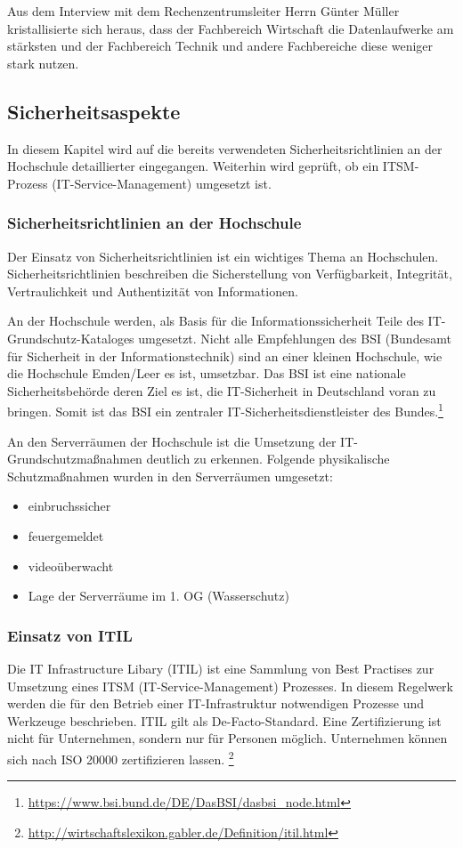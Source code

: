 Aus dem Interview mit dem Rechenzentrumsleiter Herrn Günter Müller kristallisierte sich heraus, dass der Fachbereich Wirtschaft die Datenlaufwerke am stärksten und der Fachbereich Technik und andere Fachbereiche diese weniger stark nutzen.

\subsection{Sicherheitsaspekte}
In diesem Kapitel wird auf die bereits verwendeten Sicherheitsrichtlinien an der Hochschule detaillierter eingegangen. Weiterhin wird geprüft, ob ein ITSM-Prozess (IT-Service-Management)  umgesetzt ist.

\subsubsection{Sicherheitsrichtlinien an der Hochschule}
Der Einsatz von Sicherheitsrichtlinien ist ein wichtiges Thema an Hochschulen. Sicherheitsrichtlinien beschreiben die Sicherstellung von Verfügbarkeit, Integrität, Vertraulichkeit und Authentizität von Informationen.

An der Hochschule werden, als Basis für die Informationssicherheit Teile des IT-Grundschutz-Kataloges umgesetzt. Nicht alle Empfehlungen des BSI (Bundesamt für Sicherheit in der Informationstechnik) sind an einer kleinen Hochschule, wie die Hochschule Emden/Leer es ist,  umsetzbar. Das BSI ist eine nationale Sicherheitsbehörde deren Ziel es ist, die IT-Sicherheit in Deutschland voran zu bringen. Somit ist das BSI ein zentraler IT-Sicherheitsdienstleister des Bundes.\footnote{\url{https://www.bsi.bund.de/DE/DasBSI/dasbsi_node.html}}

An den Serverräumen der Hochschule ist die Umsetzung der IT-Grundschutzmaßnahmen deutlich zu erkennen.
Folgende physikalische Schutzmaßnahmen wurden in den Serverräumen umgesetzt:

\begin{itemize}
	\item einbruchssicher
	\item feuergemeldet
	\item videoüberwacht
	\item Lage der Serverräume im 1. OG (Wasserschutz)
\end{itemize}

\subsubsection{Einsatz von ITIL}
Die IT Infrastructure Libary (ITIL) ist eine Sammlung von Best Practises zur Umsetzung eines ITSM (IT-Service-Management) Prozesses. In diesem Regelwerk werden die für den Betrieb einer IT-Infrastruktur notwendigen Prozesse und Werkzeuge beschrieben. ITIL gilt als De-Facto-Standard. Eine Zertifizierung ist nicht für Unternehmen, sondern nur für Personen möglich. Unternehmen können sich nach ISO 20000 zertifizieren lassen. \footnote{\url{http://wirtschaftslexikon.gabler.de/Definition/itil.html}}

